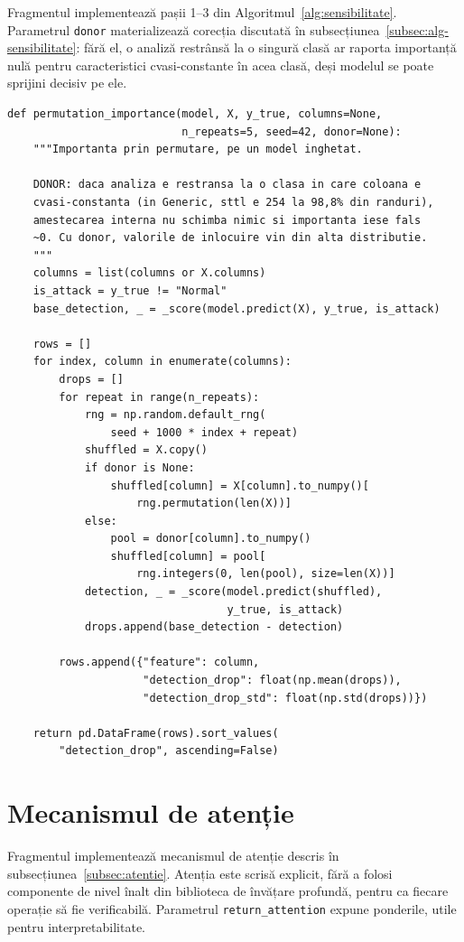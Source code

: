 Fragmentul implementează pașii 1--3 din Algoritmul~\ref{alg:sensibilitate}. Parametrul \verb|donor| materializează corecția discutată în subsecțiunea~\ref{subsec:alg-sensibilitate}: fără el, o analiză restrânsă la o singură clasă ar raporta importanță nulă pentru caracteristici cvasi-constante în acea clasă, deși modelul se poate sprijini decisiv pe ele.

\begin{verbatim}
def permutation_importance(model, X, y_true, columns=None,
                           n_repeats=5, seed=42, donor=None):
    """Importanta prin permutare, pe un model inghetat.

    DONOR: daca analiza e restransa la o clasa in care coloana e
    cvasi-constanta (in Generic, sttl e 254 la 98,8% din randuri),
    amestecarea interna nu schimba nimic si importanta iese fals
    ~0. Cu donor, valorile de inlocuire vin din alta distributie.
    """
    columns = list(columns or X.columns)
    is_attack = y_true != "Normal"
    base_detection, _ = _score(model.predict(X), y_true, is_attack)

    rows = []
    for index, column in enumerate(columns):
        drops = []
        for repeat in range(n_repeats):
            rng = np.random.default_rng(
                seed + 1000 * index + repeat)
            shuffled = X.copy()
            if donor is None:
                shuffled[column] = X[column].to_numpy()[
                    rng.permutation(len(X))]
            else:
                pool = donor[column].to_numpy()
                shuffled[column] = pool[
                    rng.integers(0, len(pool), size=len(X))]
            detection, _ = _score(model.predict(shuffled),
                                  y_true, is_attack)
            drops.append(base_detection - detection)

        rows.append({"feature": column,
                     "detection_drop": float(np.mean(drops)),
                     "detection_drop_std": float(np.std(drops))})

    return pd.DataFrame(rows).sort_values(
        "detection_drop", ascending=False)
\end{verbatim}


\section{Mecanismul de atenție}\label{sec:anexa-atentie}

Fragmentul implementează mecanismul de atenție descris în subsecțiunea~\ref{subsec:atentie}. Atenția este scrisă explicit, fără a folosi componente de nivel înalt din biblioteca de învățare profundă, pentru ca fiecare operație să fie verificabilă. Parametrul \verb|return_attention| expune ponderile, utile pentru interpretabilitate.

